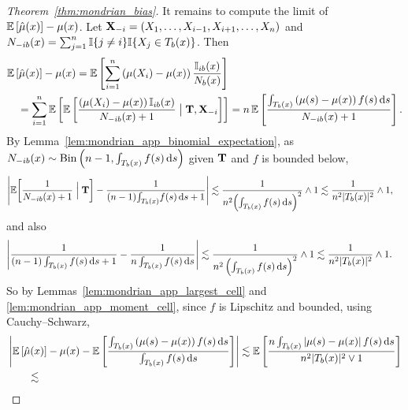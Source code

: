 \begin{proof}[Theorem~\ref{thm:mondrian_bias}]

  It remains to compute the limit of
  $\mathbb{E} \left[ \hat \mu(x) \right] - \mu(x)$.
  Let $\mathbf{X}_{-i} = (X_1, \ldots, X_{i-1}, X_{i+1}, \ldots, X_n)$
  and $N_{-i b}(x) = \sum_{j=1}^n \mathbb{I}\{j \neq i\} \mathbb{I}\{X_j \in T_b(x)\}$.
  Then
  \begin{align*}
    &\mathbb{E} \left[ \hat \mu(x) \right]
    - \mu(x)
    =
    \mathbb{E} \left[
      \sum_{i=1}^{n}
      \left( \mu(X_i) - \mu(x) \right)
      \frac{\mathbb{I}_{i b}(x)}{N_b(x)}
    \right] \\
    &\quad=
    \sum_{i=1}^{n}
    \mathbb{E} \left[
      \mathbb{E} \left[
        \frac{\left( \mu(X_i) - \mu(x) \right)\mathbb{I}_{i b}(x)}
        {N_{-i b}(x) + 1}
        \bigm| \mathbf{T}, \mathbf{X}_{-i}
      \right]
    \right]
    = n \,
    \mathbb{E} \left[
      \frac{\int_{T_b(x)} \left( \mu(s) - \mu(x) \right) f(s) \,\mathrm{d}s}
      {N_{-i b}(x) + 1}
    \right].
  \end{align*}
  By Lemma~\ref{lem:mondrian_app_binomial_expectation}, as
  $N_{-i b}(x) \sim \operatorname{Bin}\left(n-1,
  \int_{T_b(x)} f(s) \,\mathrm{d}s \right)$
  given $\mathbf{T}$ and $f$ is bounded below,
  \begin{align*}
    \left|
    \mathbb{E} \! \left[
      \frac{1}{N_{-i b}(x) + 1}
      \Bigm| \mathbf{T}
    \right]
    - \frac{1}{(n-1) \! \int_{T_b(x)} \! f(s) \,\mathrm{d}s + 1}
    \right|
    &\lesssim
    \frac{1}{n^2 \! \left( \int_{T_b(x)} f(s) \,\mathrm{d}s \right)^2}
    \wedge 1
    \lesssim
    \frac{1}{n^2 |T_b(x)|^2}
    \wedge 1,
  \end{align*}
  and also
  \begin{align*}
    \left|
    \frac{1}{(n-1) \int_{T_b(x)} f(s) \,\mathrm{d}s + 1}
    - \frac{1}{n \int_{T_b(x)} f(s) \,\mathrm{d}s}
    \right|
    &\lesssim
    \frac{1}{n^2 \left( \int_{T_b(x)} f(s) \,\mathrm{d}s\right)^2}
    \wedge 1
    \lesssim
    \frac{1}{n^2 |T_b(x)|^2}
    \wedge 1.
  \end{align*}
  So by Lemmas~\ref{lem:mondrian_app_largest_cell}
  and \ref{lem:mondrian_app_moment_cell},
  since $f$ is Lipschitz and bounded, using Cauchy--Schwarz,
  \begin{align*}
    &\left|
    \E \left[ \hat \mu(x) \right]
    - \mu(x)
    - \E \left[
      \frac{\int_{T_b(x)} \left( \mu(s) - \mu(x) \right) f(s) \diff s}
      {\int_{T_b(x)} f(s) \diff s}
    \right]
    \right|
    \lesssim
    \E \left[
      \frac{n \int_{T_b(x)} \left| \mu(s) - \mu(x) \right| f(s) \diff s}
      {n^2 |T_b(x)|^2 \vee 1}
    \right] \\
    &\qquad\lesssim

\end{align*}
\end{proof}
